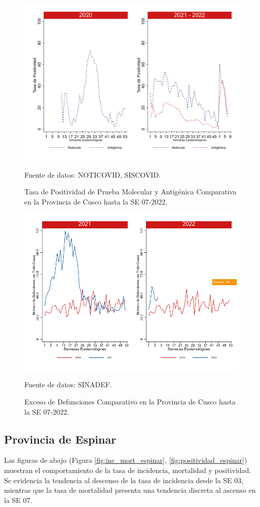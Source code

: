 \documentclass[12pt,a4paper,openany]{book}
\begin{document}
		\begin{figure}[h]
			\caption{Tasa de Positividad de Prueba Molecular y Antigénica Comparativa en la Provincia de Cusco hasta la SE 07-2022.}\label{fig:positividad_cusco}
			\begin{center}
				\includegraphics[width=0.7\linewidth]{../figuras/positividad_20_21_7.png}
			\end{center}
			{\footnotesize {Fuente de datos: NOTICOVID, SISCOVID.}}
		\end{figure}
		
		\begin{figure}[h]
			\caption{Exceso de Defunciones Comparativo en la Provincia de Cusco hasta la SE 07-2022.}\label{fig:exceso_cusco}
			\begin{center}
				\includegraphics[width=0.7\linewidth]{../figuras/exceso_7.pdf}
			\end{center}
			{\footnotesize {Fuente de datos: SINADEF.}}
		\end{figure}
		
		\clearpage
		
		\subsection*{Provincia de Espinar}
		\noindent Las figuras de abajo (Figura \ref{fig:inc_mort_espinar}, \ref{fig:positividad_espinar}) muestran el comportamiento de la tasa de incidencia, mortalidad y positividad. Se evidencia la tendencia al descenso de la tasa de incidencia desde la SE 03, mientras que la tasa de mortalidad presenta una tendencia discreta al ascenso en la SE 07.  
		
\end{document}
